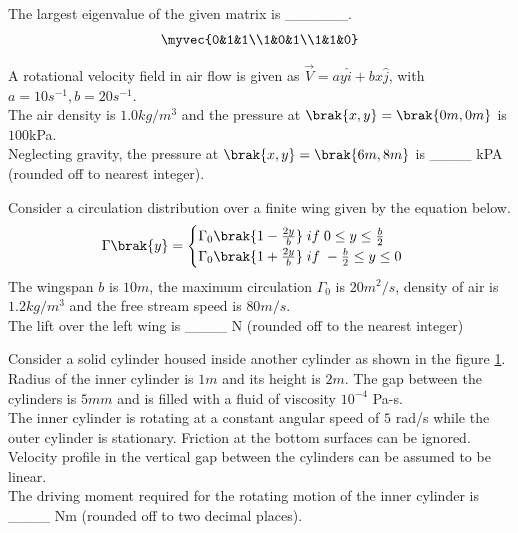         \item The largest eigenvalue of the given matrix is \_\_\_\_\_\_.
            \begin{align*}
                \myvec{0&1&1\\1&0&1\\1&1&0}
            \end{align*}

        \item A rotational velocity field in air flow is given as $\overrightarrow{V} = ay\hat{i} + bx\hat{j}$, with $a=10 s^{-1},b=20 s^{-1}$.\\The air density is $1.0 kg/m^3$ and the pressure at $\brak{x,y} = \brak{0m, 0m}$ is $100$kPa.\\Neglecting gravity, the pressure at $\brak{x,y} = \brak{6m,8m}$ is \_\_\_\_ kPA (rounded off to nearest integer).

        \item Consider a circulation distribution over a finite wing given by the equation below.
            \begin{align*}
                \Gamma \brak{y} = 
                \begin{cases}
                    \Gamma _ 0 \brak{1 - \frac{2y}{b}} \; if \; 0 \leq y \leq \frac{b}{2}\\
                    \Gamma _ 0 \brak{1 + \frac{2y}{b}} \; if \; -\frac{b}{2} \leq y \leq 0\\
                \end{cases}
            \end{align*}
            The wingspan $b$ is $10m$, the maximum circulation $\Gamma _ 0$ is $20 m^2/s$, density of air is $1.2 kg/m^3$ and the free stream speed is $80 m/s$.\\The lift over the left wing is \_\_\_\_ N (rounded off to the nearest integer)

    \item Consider a solid cylinder housed inside another cylinder as shown in the figure \ref{52fig}. Radius of the inner cylinder is $1 m$ and its height is $2 m$. The gap between the cylinders is $5 mm$ and is filled with a fluid of viscosity $10^{-4}$ Pa-s.\\The inner cylinder is rotating at a constant angular speed of $5$ rad/s while the outer cylinder is stationary. Friction at the bottom surfaces can be ignored. Velocity profile in the vertical gap between the cylinders can be assumed to be linear.\\ The driving moment required for the rotating motion of the inner cylinder is \_\_\_\_ Nm (rounded off to two decimal places).
    \begin{figure}[H]
        \centering
        
        \caption{}
        \label{52fig}
    \end{figure}
        


